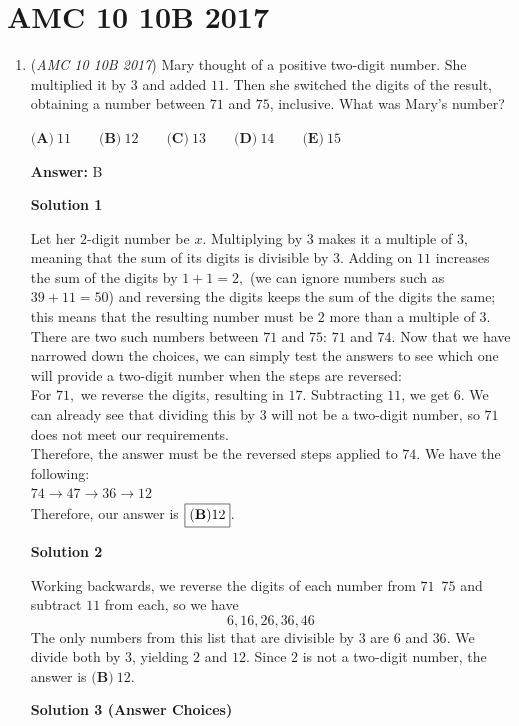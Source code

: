 \section{AMC 10 10B 2017}
        \begin{enumerate}
        	\item (\textit{AMC 10 10B 2017}) Mary thought of a positive two-digit number. She multiplied it by $3$ and added $11$. Then she switched the digits of the result, obtaining a number between $71$ and $75$, inclusive. What was Mary's number? 


 $\textbf{(A)}\ 11\qquad\textbf{(B)}\ 12\qquad\textbf{(C)}\ 13\qquad\textbf{(D)}\ 14\qquad\textbf{(E)}\ 15$

 \textbf{Answer: }B



\textbf{Solution 1}

Let her $2$-digit number be $x$. Multiplying by $3$ makes it a multiple of $3$, meaning that the sum of its digits is divisible by $3$. Adding on $11$ increases the sum of the digits by $1+1 = 2,$ (we can ignore numbers such as $39+11=50$) and reversing the digits keeps the sum of the digits the same; this means that the resulting number must be $2$ more than a multiple of $3$. There are two such numbers between $71$ and $75$: $71$ and $74.$ Now that we have narrowed down the choices, we can simply test the answers to see which one will provide a two-digit number when the steps are reversed:
 \[\]For $71,$ we reverse the digits, resulting in $17.$ Subtracting $11$, we get $6.$ We can already see that dividing this by $3$ will not be a two-digit number, so $71$ does not meet our requirements.
 \[\]Therefore, the answer must be the reversed steps applied to $74.$ We have the following:
 \[\]$74\rightarrow47\rightarrow36\rightarrow12$
 \[\]Therefore, our answer is $\boxed{\bold{(B)} 12}$.

 



\textbf{Solution 2}

Working backwards, we reverse the digits of each number from $71$~$75$ and subtract $11$ from each, so we have
 \[6, 16, 26, 36, 46\]The only numbers from this list that are divisible by $3$ are $6$ and $36$. We divide both by $3$, yielding $2$ and $12$. Since $2$ is not a two-digit number, the answer is $\boxed{\textbf{(B)}\ 12}$.

 



\textbf{Solution 3 (Answer Choices)}


\end{enumerate}
